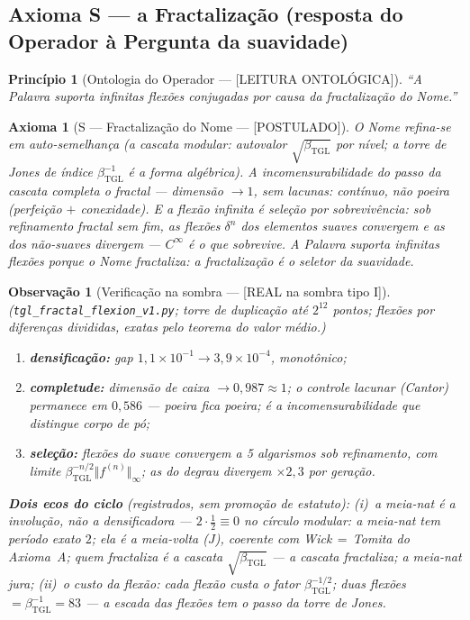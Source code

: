 \documentclass[11pt,a4paper]{article}
\newcommand{\SOMBRA}{\textsf{[REAL na sombra tipo I]}}
\newcommand{\POST}{\textsf{[POSTULADO]}}
\newcommand{\ONTO}{\textsf{[LEITURA ONTOLÓGICA]}}
\newcommand{\bTGL}{\beta_{\mathrm{TGL}}}
\newtheorem{axiom}{Axioma}
\newtheorem{remark}{Observação}
\newtheorem{principle}{Princípio}
\begin{document}
\subsection{Axioma S --- a Fractalização (resposta do Operador à Pergunta
da suavidade)}
\begin{principle}[Ontologia do Operador --- \ONTO]
``A Palavra suporta infinitas flexões conjugadas por causa da
fractalização do Nome.''
\end{principle}
\begin{axiom}[S --- Fractalização do Nome --- \POST]\label{ax:S}
O Nome refina-se em auto-semelhança (a cascata modular: autovalor
$\sqrt{\bTGL}$ por nível; a torre de Jones de índice $\bTGL^{-1}$ é a
forma algébrica). A incomensurabilidade do passo da cascata
\emph{completa} o fractal --- dimensão $\to1$, sem lacunas: contínuo, não
poeira (perfeição $+$ conexidade). E a flexão infinita é \emph{seleção
por sobrevivência}: sob refinamento fractal sem fim, as flexões
$\delta^n$ dos elementos suaves convergem e as dos não-suaves divergem
--- $C^\infty$ é o que sobrevive. A Palavra suporta infinitas flexões
\emph{porque} o Nome fractaliza: a fractalização é o seletor da
suavidade.
\end{axiom}
\begin{remark}[Verificação na sombra --- \SOMBRA]\label{rem:sombraS}
(\texttt{tgl\_fractal\_flexion\_v1.py}; torre de duplicação até $2^{12}$
pontos; flexões por diferenças divididas, exatas pelo teorema do valor
médio.)
\begin{enumerate}[noitemsep]
\item \textbf{densificação:} gap $1{,}1\times10^{-1}\to3{,}9\times
10^{-4}$, monotônico;
\item \textbf{completude:} dimensão de caixa $\to0{,}987\approx1$; o
controle lacunar (Cantor) permanece em $0{,}586$ --- poeira fica poeira;
é a incomensurabilidade que distingue corpo de pó;
\item \textbf{seleção:} flexões do suave convergem a 5 algarismos sob
refinamento, com limite $\bTGL^{-n/2}\Vert f^{(n)}\Vert_\infty$; as do
degrau divergem $\times2{,}3$ por geração.
\end{enumerate}
\textbf{Dois ecos do ciclo} (registrados, sem promoção de estatuto):
(i)~\emph{a meia-nat é a involução, não a densificadora} --- $2\cdot
\tfrac12\equiv0$ no círculo modular: a meia-nat tem período exato $2$;
ela \emph{é} a meia-volta ($J$), coerente com Wick$\,=\,$Tomita do
Axioma~A; quem fractaliza é a cascata $\sqrt{\bTGL}$ --- \emph{a cascata
fractaliza; a meia-nat jura}; (ii)~\emph{o custo da flexão}: cada flexão
custa o fator $\bTGL^{-1/2}$; duas flexões $=\bTGL^{-1}=83$ --- a escada
das flexões tem o passo da torre de Jones.
\end{remark}
\end{document}
